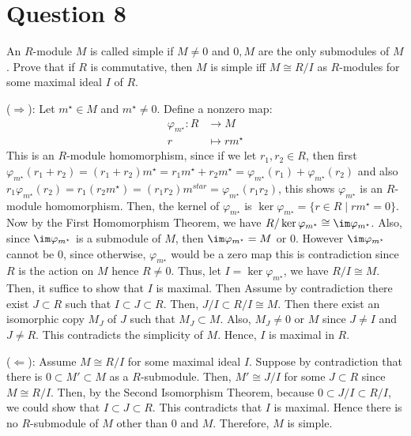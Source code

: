 \section{Question 8}

\begin{question}
    An $R$-module $M$ is called simple if $M \neq 0$ and $0, M$ are the only submodules of $M$. Prove that if $R$ is commutative, then $M$ is simple iff $M \cong R / I$ as $R$-modules for some maximal ideal $I$ of $R$.
\end{question}

\begin{answer}
    ($\Rightarrow$): Let $m^{\star} \in M$ and $m^{\star} \neq 0$. Define a nonzero map:
    \begin{equation}
        \begin{aligned}
            \varphi_{m^{\star}}: R &\to M\\
            r &\mapsto rm^{\star}
        \end{aligned}
    \end{equation}
    This is an $R$-module homomorphism, since if we let $r_1,r_2 \in R$, then first $\varphi_{m^{\star}}(r_1+r_2) = (r_1 + r_2)m^{\star} = r_1m^{\star} + r_2m^{\star} = \varphi_{m^{\star}}(r_1) + \varphi_{m^{\star}}(r_2)$ and also $r_1\varphi_{m^{\star}}(r_2) = r_1(r_2m^{\star}) = (r_1r_2)m^{star} = \varphi_{m^{\star}}(r_1r_2)$, this shows $\varphi_{m^{\star}}$ is an $R$-module homomorphism. Then, the kernel of $\varphi_{m^{\star}}$ is $\ker \varphi_{m^{\star}} = \{r \in R \mid rm^{\star} = 0\}$. Now by the First Homomorphism Theorem, we have $R/\ker \varphi_{m^{\star}} \cong \im \varphi_{m^{\star}}$. Also, since $\im \varphi_{m^{\star}}$ is a submodule of $M$, then $\im \varphi_{m^{\star}} = M$ or $0$. However $\im \varphi_{m^{\star}}$ cannot be $0$, since otherwise, $\varphi_{m^{\star}}$ would be a zero map this is contradiction since $R$ is the action on $M$ hence $R \neq 0$. Thus, let $I = \ker \varphi_{m^{\star}}$, we have $R/I \cong M$. Then, it suffice to show that $I$ is maximal. Then Assume by contradiction there exist $J \subset R$ such that $I \subset J \subset R$. Then, $J/I \subset R/I \cong M$. Then there exist an isomorphic copy $M_J$ of $J$ such that $M_J \subset M$. Also, $M_J \neq 0$ or $M$ since $J \neq I$ and $J \neq R$. This contradicts the simplicity of $M$. Hence, $I$ is maximal in $R$.
    
    ($\Leftarrow$): Assume $M \cong R/I$ for some maximal ideal $I$. Suppose by contradiction that there is $0 \subset M' \subset M$ as a $R$-submodule. Then, $M' \cong J/I$ for some $J \subset R$ since $M \cong R/I$. Then, by the Second Isomorphism Theorem, because $0 \subset J/I \subset R/I$, we could show that $I \subset J \subset R$. This contradicts that $I$ is maximal. Hence there is no $R$-submodule of $M$ other than $0$ and $M$. Therefore, $M$ is simple.
\end{answer}